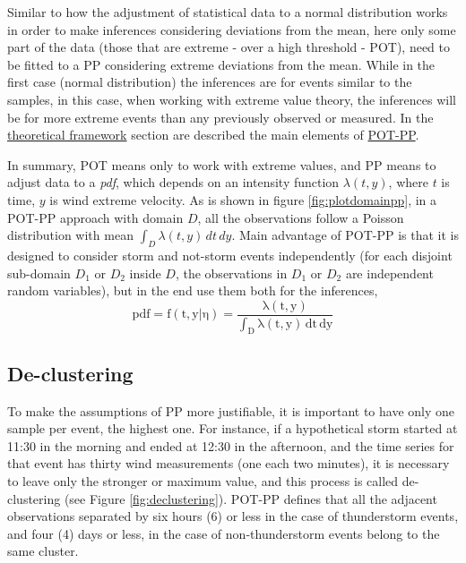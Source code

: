 \documentclass[12pt,oneside]{reedthesis}
\begin{document}
Similar to how the adjustment of statistical data to a normal distribution works in order to make inferences considering deviations from the mean, here only some part of the data (those that are extreme - over a high threshold - POT), need to be fitted to a PP considering extreme deviations from the mean. While in the first case (normal distribution) the inferences are for events similar to the samples, in this case, when working with extreme value theory, the inferences will be for more extreme events than any previously observed or measured. In the \protect\hyperlink{rmd-thefra}{theoretical framework} section are described the main elements of \protect\hyperlink{pot-pp}{POT-PP}.

In summary, POT means only to work with extreme values, and PP means to adjust data to a \emph{pdf}, which depends on an intensity function \(\lambda(t,y)\), where \(t\) is time, \(y\) is wind extreme velocity. As is shown in figure \ref{fig:plotdomainpp}, in a POT-PP approach with domain \(D\), all the observations follow a Poisson distribution with mean \(\int_D\lambda(t,y)\,dt\,dy\). Main advantage of POT-PP is that it is designed to consider storm and not-storm events independently (for each disjoint sub-domain \(D_1\) or \(D_2\) inside \(D\), the observations in \(D_1\) or \(D_2\) are independent random variables), but in the end use them both for the inferences,
\begin{equation}
  \mathrm{
          pdf = f(t,y|\eta) = \frac{\lambda(t,y)}{\int_D\lambda(t,y)\,dt\,dy}
        }
  \label{eq:pppdf}
\end{equation}
\hypertarget{de-clustering}{%
\subsection{De-clustering}\label{de-clustering}}

To make the assumptions of PP more justifiable, it is important to have only one sample per event, the highest one. For instance, if a hypothetical storm started at 11:30 in the morning and ended at 12:30 in the afternoon, and the time series for that event has thirty wind measurements (one each two minutes), it is necessary to leave only the stronger or maximum value, and this process is called de-clustering (see Figure \ref{fig:declustering}). POT-PP defines that all the adjacent observations separated by six hours (6) or less in the case of thunderstorm events, and four (4) days or less, in the case of non-thunderstorm events belong to the same cluster.
\end{document}
